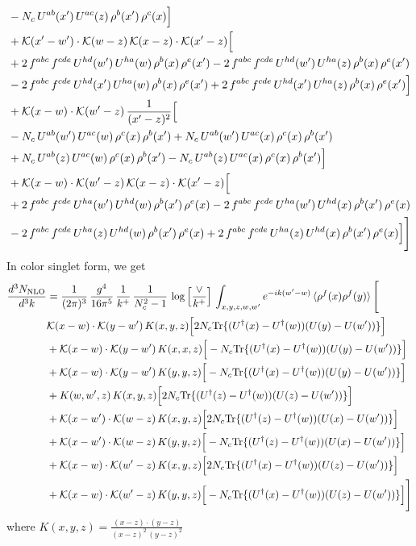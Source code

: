 \documentclass[9pt]{article}
\numberwithin{equation}{section}
\begin{document}
\begin{align}
& -N_{c}\,U^{ab}(x')\,U^{ac}(z)\,\rho^{b}(x')\,\rho^{c}(x)\Big]\notag\\
& +\mathcal{K}(x'-w')\cdot\mathcal{K}(w-z)\,\mathcal{K}(x-z)\cdot\mathcal{K}(x'-z)\Big[\notag\\
& +2\,f^{abc}\,f^{cde}\,U^{hd}(w')\,U^{ha}(w)\,\rho^{b}(x)\,\rho^{e}(x') -2\,f^{abc}\,f^{cde}\,U^{hd}(w')\,U^{ha}(z)\,\rho^{b}(x)\,\rho^{e}(x')\notag\\
& -2\,f^{abc}\,f^{cde}\,U^{hd}(x')\,U^{ha}(w)\,\rho^{b}(x)\,\rho^{e}(x') +2\,f^{abc}\,f^{cde}\,U^{hd}(x')\,U^{ha}(z)\,\rho^{b}(x)\,\rho^{e}(x')\Big]\notag\\
& +\mathcal{K}(x-w)\cdot\mathcal{K}(w'-z)\,\frac{1}{(x'-z)^{2}}\Big[\notag\\
& -N_{c}\,U^{ab}(w')\,U^{ac}(w)\,\rho^{c}(x)\,\rho^{b}(x') +N_{c}\,U^{ab}(w')\,U^{ac}(x)\,\rho^{c}(x)\,\rho^{b}(x')\notag\\
& +N_{c}\,U^{ab}(z)\,U^{ac}(w)\,\rho^{c}(x)\,\rho^{b}(x') -N_{c}\,U^{ab}(z)\,U^{ac}(x)\,\rho^{c}(x)\,\rho^{b}(x')\Big]\notag\\
& +\mathcal{K}(x-w)\cdot\mathcal{K}(w'-z)\,\mathcal{K}(x-z)\cdot\mathcal{K}(x'-z)\Big[\notag\\
& +2\,f^{abc}\,f^{cde}\,U^{ha}(w')\,U^{hd}(w)\,\rho^{b}(x')\,\rho^{e}(x) -2\,f^{abc}\,f^{cde}\,U^{ha}(w')\,U^{hd}(x)\,\rho^{b}(x')\,\rho^{e}(x)\notag\\
& -2\,f^{abc}\,f^{cde}\,U^{ha}(z)\,U^{hd}(w)\,\rho^{b}(x')\,\rho^{e}(x) +2\,f^{abc}\,f^{cde}\,U^{ha}(z)\,U^{hd}(x)\,\rho^{b}(x')\,\rho^{e}(x)\Big]\Bigg]
\end{align}
In color singlet form, we get
\begin{align}
\frac{d^{3}N_{\mathrm{NLO}}}{d^{3}k} & = \frac{1}{(2\pi)^{3}}\,\frac{g^{4}}{16\pi^{5}}\,\frac{1}{k^{+}}\,\frac{1}{N^{2}_{c}-1}\,\log\Big[\frac{\vee}{k^{+}}\Big]\,\int_{x,y,z,w,w'}e^{-ik(w'-w)}\,\langle\rho^{f}(x)\rho^{f}(y) \rangle\,\Bigg[ \notag\\ & \mathcal K(x-w)\cdot\mathcal K(y-w')\,K(x,y,z)\Big[2 N_{c}{\rm Tr}\{(U^\dagger(x)-U^\dagger(w))(U(y)-U(w'))\}\Big]\notag\\
&+\mathcal K(x-w)\cdot\mathcal K(y-w')\,K(x,x,z)\Big[-N_{c}{\rm Tr}\{(U^\dagger(x)-U^\dagger(w))(U(y)-U(w'))\}\Big]\notag\\
&+\mathcal K(x-w)\cdot\mathcal K(y-w')\,K(y,y,z)\Big[-N_{c}{\rm Tr}\{(U^\dagger(x)-U^\dagger(w))(U(y)-U(w'))\}\Big]\notag\\
&+K(w,w',z)\,K(x,y,z)\Big[2 N_{c}{\rm Tr}\{(U^\dagger(z)-U^\dagger(w))(U(z)-U(w'))\}\Big]\notag\\
&+\mathcal K(x-w')\cdot\mathcal K(w-z)\,K(x,y,z)\Big[2 N_{c}{\rm Tr}\{(U^\dagger(z)-U^\dagger(w))(U(x)-U(w'))\}\Big]\notag\\
&+\mathcal K(x-w')\cdot\mathcal K(w-z)\,K(y,y,z)\Big[-N_{c}{\rm Tr}\{(U^\dagger(z)-U^\dagger(w))(U(x)-U(w'))\}\Big]\notag\\
&+\mathcal K(x-w)\cdot\mathcal K(w'-z)\,K(x,y,z)\Big[2 N_{c}{\rm Tr}\{(U^\dagger(x)-U^\dagger(w))(U(z)-U(w'))\}\Big]\notag\\
&+\mathcal K(x-w)\cdot\mathcal K(w'-z)\,K(y,y,z)\Big[-N_{c}{\rm Tr}\{(U^\dagger(x)-U^\dagger(w))(U(z)-U(w'))\}\Big]\Bigg]
\end{align}
where $K(x,y,z) = \frac{(x-z)\cdot (y-z)}{(x-z)^{2}\, (y-z)^{2}}$
\end{document}
